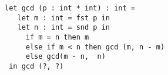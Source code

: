 \begin{lstlisting}[style=Slang]
 let gcd (p : int * int) : int = 
   let m : int = fst p in 
   let n : int = snd p in 
     if m = n then m 
     else if m < n then gcd (m, n - m)
     else gcd(m - n,  n)
 in gcd (?, ?)
\end{lstlisting}